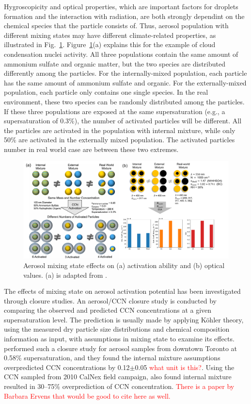 \documentclass[edeposit,fullpage]{uiucthesis2009}
\begin{document}
Hygroscopicity and optical properties, which are important factors for
droplets formation and the interaction with radiation, are both
strongly dependint on the chemical species that the particle consists
of. Thus, aerosol population with different mixing states may have
different climate-related properties, as illustrated in
Fig.~\ref{fig:chap1-chi-climate}. Figure~\ref{fig:chap1-chi-climate}(a)
explains this for the example of cloud condensation nuclei
activity. All three populations contain the same amount of ammonium
sulfate and organic matter, but the two species are distributed
differently among the particles. For the internally-mixed population,
each particle has the same amount of ammonium sulfate and organic. For
the externally-mixed population, each particle only contains one
single species. In the real environment, these two species can be
randomly distributed among the particles. If these three populations
are exposed at the same supersaturation (e.g., a supersaturation of
0.3\%), the number of activated particles will be different. All the
particles are activated in the population with internal mixture, while
only 50\% are activated in the externally mixed population. The
activated particles number in real world case are between these two
extremes.

\begin{figure}
	\centering
	\includegraphics[scale=0.60]{chap1_figs/thesis_chap1_fig3.pdf}
	\caption{Aerosol mixing state effects on (a) activation
          ability and (b) optical values. (a) is adapted from
          \cite{Riemer2019}.}
	\label{fig:chap1-chi-climate}
\end{figure}

The effects of mixing state on aerosol activation potential has been
investigated through closure studies. An aerosol/CCN closure study is
conducted by comparing the observed and predicted CCN concentrations
at a given supersaturation level. The prediction is usually made by
applying K\"ohler theory, using the measured dry particle size
distributions and chemical composition information as input, with
assumptions in mixing state to examine its effects.
\citet{broekhuizen2006closure} performed such a closure study for
aerosol samples from downtown Toronto at 0.58\% supersaturation, and
they found the internal mixture assumptions overpredicted CCN
concentrations by 0.12$\pm$0.05 \textcolor{red}{what unit is
  this?}. Using the CCN sampled from 2010 CalNex field campaign,
\citet{moore2012hygroscopicity} also found internal mixture resulted
in 30--75\% overprediction of CCN concentration. \textcolor{red}{There
  is a paper by Barbara Ervens that would be good to cite here as
  well.}
\end{document}
